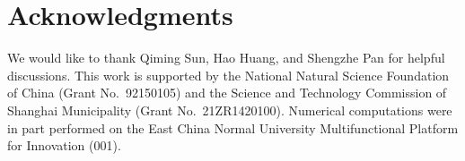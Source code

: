 \documentclass[preprint,12pt]{elsarticle} %
\begin{document}
\section*{Acknowledgments}

We would like to thank Qiming Sun, Hao Huang, and Shengzhe Pan for helpful discussions.
This work is supported by the National Natural Science Foundation of China (Grant No.\ 92150105) and the Science and Technology Commission of Shanghai Municipality (Grant No.\ 21ZR1420100).
Numerical computations were in part performed on the East China Normal University Multifunctional Platform for Innovation (001).



\end{document}
